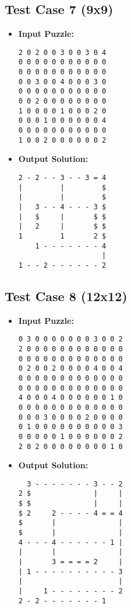 \subsection{Test Case 7 (9x9)}
\begin{itemize}
    \item \textbf{Input Puzzle:}
    \begin{verbatim}
2 0 2 0 0 3 0 0 3 0 4
0 0 0 0 0 0 0 0 0 0 0
0 0 0 0 0 0 0 0 0 0 0
0 0 3 0 0 4 0 0 0 3 0
0 0 0 0 0 0 0 0 0 0 0
0 0 2 0 0 0 0 0 0 0 0
1 0 0 0 0 1 0 0 0 2 0
0 0 0 1 0 0 0 0 0 0 4
0 0 0 0 0 0 0 0 0 0 0
1 0 0 2 0 0 0 0 0 0 2
    \end{verbatim}
    \item \textbf{Output Solution:}
    \begin{verbatim}
2 - 2 - - 3 - - 3 = 4
|         |         $
|         |         $
|   3 - - 4 - - - 3 $
|   $     |       $ $
|   2     |       $ $
1         1       2 $
    1 - - - - - - - 4
                    |
1 - - 2 - - - - - - 2
    \end{verbatim}
\end{itemize}

\subsection{Test Case 8 (12x12)}
\begin{itemize}
    \item \textbf{Input Puzzle:}
    \begin{verbatim}
0 3 0 0 0 0 0 0 0 3 0 0 2
2 0 0 0 0 0 0 0 0 0 0 0 0
0 0 0 0 0 0 0 0 0 0 0 0 0
0 2 0 0 2 0 0 0 0 4 0 0 4
0 0 0 0 0 0 0 0 0 0 0 0 0
0 0 0 0 0 0 0 0 0 0 0 0 0
4 0 0 0 4 0 0 0 0 0 0 1 0
0 0 0 0 0 0 0 0 0 0 0 0 0
0 0 0 3 0 0 0 0 2 0 0 0 0
0 1 0 0 0 0 0 0 0 0 0 0 3
0 0 0 0 0 1 0 0 0 0 0 0 2
2 0 2 0 0 0 0 0 0 0 0 1 0
    \end{verbatim}
    \item \textbf{Output Solution:}
    \begin{verbatim}
  3 - - - - - - - 3 - - 2
2 $               |     |
$ $               |     |
$ 2     2 - - - - 4 = = 4
$       |               |
$       |               |
4 - - - 4 - - - - - - 1 |
|       |               |
|       3 = = = = 2     |
| 1 - - - - - - - - - - 3
|                       |
|     1 - - - - - - - - 2
2 - 2 - - - - - - - 1    
    \end{verbatim}
\end{itemize}

